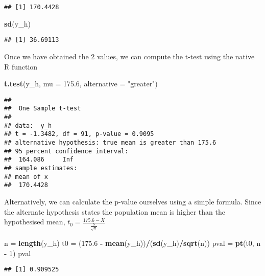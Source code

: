 \documentclass[
]{article}
\newenvironment{Shaded}{\begin{snugshade}}{\end{snugshade}}
\newcommand{\DataTypeTok}[1]{\textcolor[rgb]{0.13,0.29,0.53}{#1}}
\newcommand{\DecValTok}[1]{\textcolor[rgb]{0.00,0.00,0.81}{#1}}
\newcommand{\FloatTok}[1]{\textcolor[rgb]{0.00,0.00,0.81}{#1}}
\newcommand{\KeywordTok}[1]{\textcolor[rgb]{0.13,0.29,0.53}{\textbf{#1}}}
\newcommand{\NormalTok}[1]{#1}
\newcommand{\OperatorTok}[1]{\textcolor[rgb]{0.81,0.36,0.00}{\textbf{#1}}}
\newcommand{\StringTok}[1]{\textcolor[rgb]{0.31,0.60,0.02}{#1}}
\begin{document}
\begin{verbatim}
## [1] 170.4428
\end{verbatim}

\begin{Shaded}
\begin{Highlighting}[]
\KeywordTok{sd}\NormalTok{(y_h)}
\end{Highlighting}
\end{Shaded}

\begin{verbatim}
## [1] 36.69113
\end{verbatim}

Once we have obtained the 2 values, we can compute the t-test using the
native R function

\begin{Shaded}
\begin{Highlighting}[]
\KeywordTok{t.test}\NormalTok{(y_h, }\DataTypeTok{mu =} \FloatTok{175.6}\NormalTok{, }\DataTypeTok{alternative =} \StringTok{"greater"}\NormalTok{)}
\end{Highlighting}
\end{Shaded}

\begin{verbatim}
## 
##  One Sample t-test
## 
## data:  y_h
## t = -1.3482, df = 91, p-value = 0.9095
## alternative hypothesis: true mean is greater than 175.6
## 95 percent confidence interval:
##  164.086     Inf
## sample estimates:
## mean of x 
##  170.4428
\end{verbatim}

Alternatively, we can calculate the p-value ourselves using a simple
formula. Since the alternate hypothesis states the population mean is
higher than the hypothesised mean,
\(t_0 = \frac{175.6 - \bar{X}}{\frac{S}{\sqrt{n}}}\)

\begin{Shaded}
\begin{Highlighting}[]
\NormalTok{n =}\StringTok{ }\KeywordTok{length}\NormalTok{(y_h)}
\NormalTok{t0 =}\StringTok{ }\NormalTok{(}\FloatTok{175.6} \OperatorTok{-}\StringTok{ }\KeywordTok{mean}\NormalTok{(y_h))}\OperatorTok{/}\NormalTok{(}\KeywordTok{sd}\NormalTok{(y_h)}\OperatorTok{/}\KeywordTok{sqrt}\NormalTok{(n))}
\NormalTok{pval =}\StringTok{ }\KeywordTok{pt}\NormalTok{(t0, n }\OperatorTok{-}\StringTok{ }\DecValTok{1}\NormalTok{)}
\NormalTok{pval}
\end{Highlighting}
\end{Shaded}

\begin{verbatim}
## [1] 0.909525
\end{verbatim}
\end{document}
